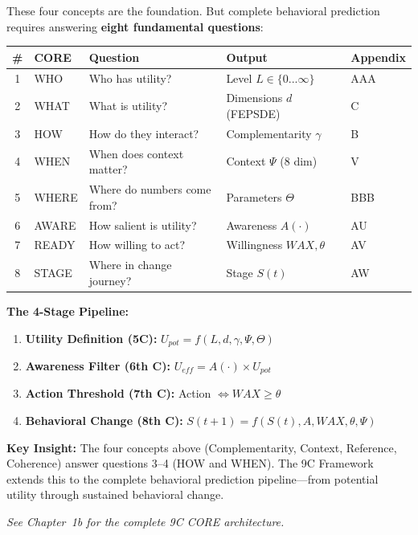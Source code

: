 \begin{tcolorbox}[colback=blue!5!white, colframe=blue!75!black,
    title=\textbf{The 9C CORE Framework}]

These four concepts are the foundation. But complete behavioral prediction
requires answering \textbf{eight fundamental questions}:

\begin{center}
\small
\begin{tabular}{@{}cllll@{}}
\toprule
\textbf{\#} & \textbf{CORE} & \textbf{Question} & \textbf{Output} & \textbf{Appendix} \\
\midrule
1 & WHO & Who has utility? & Level $L \in \{0...\infty\}$ & AAA \\
2 & WHAT & What is utility? & Dimensions $d$ (FEPSDE) & C \\
3 & HOW & How do they interact? & Complementarity $\gamma$ & B \\
4 & WHEN & When does context matter? & Context $\Psi$ (8 dim) & V \\
5 & WHERE & Where do numbers come from? & Parameters $\Theta$ & BBB \\
6 & AWARE & How salient is utility? & Awareness $A(\cdot)$ & AU \\
7 & READY & How willing to act? & Willingness $WAX, \theta$ & AV \\
8 & STAGE & Where in change journey? & Stage $S(t)$ & AW \\
\bottomrule
\end{tabular}
\end{center}

\textbf{The 4-Stage Pipeline:}
\begin{enumerate}[nosep]
    \item \textbf{Utility Definition (5C):} $U_{pot} = f(L, d, \gamma, \Psi, \Theta)$
    \item \textbf{Awareness Filter (6th C):} $U_{eff} = A(\cdot) \times U_{pot}$
    \item \textbf{Action Threshold (7th C):} Action $\Leftrightarrow WAX \geq \theta$
    \item \textbf{Behavioral Change (8th C):} $S(t+1) = f(S(t), A, WAX, \theta, \Psi)$
\end{enumerate}

\textbf{Key Insight:} The four concepts above (Complementarity, Context, Reference, Coherence) answer questions 3--4 (HOW and WHEN). The 9C Framework extends this to the complete behavioral prediction pipeline---from potential utility through sustained behavioral change.

\textit{See Chapter~1b for the complete 9C CORE architecture.}

\end{tcolorbox}

